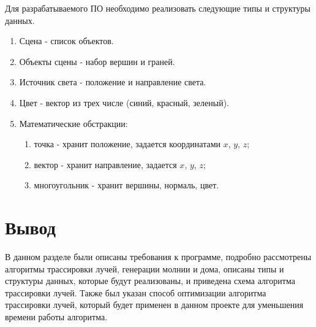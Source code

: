 Для разрабатываемого ПО необходимо реализовать следующие типы и структуры данных.
\begin{enumerate}
	\item Сцена - список объектов.
	\item Объекты сцены - набор вершин и граней.
	\item Источник света - положение и направление света.
	\item Цвет - вектор из трех числе (синий, красный, зеленый).
	\item Математические обстракции:
	\begin{enumerate}
		\item точка - хранит положение, задается координатами $x$, $y$, $z$;
		\item вектор - хранит направление, задается  $x$, $y$, $z$;
		\item многоугольник - хранит вершины, нормаль, цвет.
	\end{enumerate}
\end{enumerate}


\section{Вывод}
В данном разделе были описаны требования к программе, подробно рассмотрены алгоритмы трассировки лучей, генерации молнии и дома, описаны типы и структуры данных, которые будут реализованы, и приведена схема алгоритма трассировки лучей. Также был указан способ оптимизации алгоритма трассировки лучей, который будет применен в данном проекте для уменьшения времени работы алгоритма.
